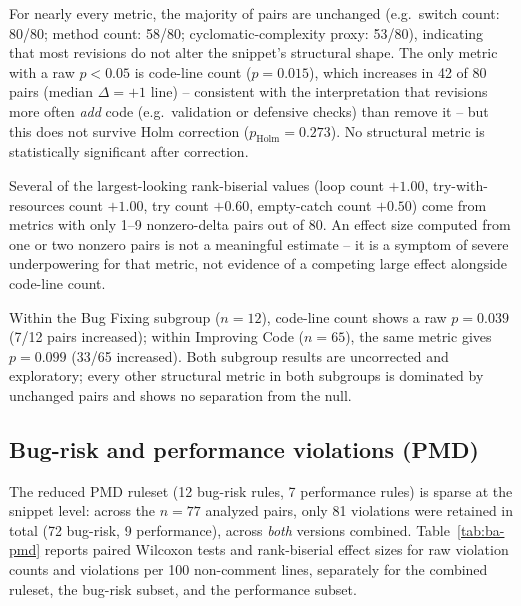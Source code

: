 For nearly every metric, the majority of pairs are unchanged (e.g.\
switch count: 80/80; method count: 58/80; cyclomatic-complexity proxy:
53/80), indicating that most revisions do not alter the snippet's
structural shape. The only metric with a raw $p<0.05$ is code-line count
($p=0.015$), which increases in 42 of 80 pairs (median $\Delta=+1$
line) -- consistent with the interpretation that revisions more often
\emph{add} code (e.g.\ validation or defensive checks) than remove it --
but this does not survive Holm correction ($p_{\text{Holm}}=0.273$). No
structural metric is statistically significant after correction.

Several of the largest-looking rank-biserial values (loop count $+1.00$,
try-with-resources count $+1.00$, try count $+0.60$, empty-catch count
$+0.50$) come from metrics with only 1--9 nonzero-delta pairs out of 80.
An effect size computed from one or two nonzero pairs is not a meaningful
estimate -- it is a symptom of severe underpowering for that metric, not
evidence of a competing large effect alongside code-line count.

Within the Bug Fixing subgroup ($n=12$), code-line count shows a raw
$p=0.039$ (7/12 pairs increased); within Improving Code ($n=65$), the
same metric gives $p=0.099$ (33/65 increased). Both subgroup results are
uncorrected and exploratory; every other structural metric in both
subgroups is dominated by unchanged pairs and shows no separation from
the null.

\subsection{Bug-risk and performance violations (PMD)}
\label{sec:before-after-pmd}

The reduced PMD ruleset (12 bug-risk rules, 7 performance rules) is
sparse at the snippet level: across the $n=77$ analyzed pairs, only 81
violations were retained in total (72 bug-risk, 9 performance), across
\emph{both} versions combined. Table~\ref{tab:ba-pmd} reports paired
Wilcoxon tests and rank-biserial effect sizes for raw violation counts
and violations per 100 non-comment lines, separately for the combined
ruleset, the bug-risk subset, and the performance subset.

